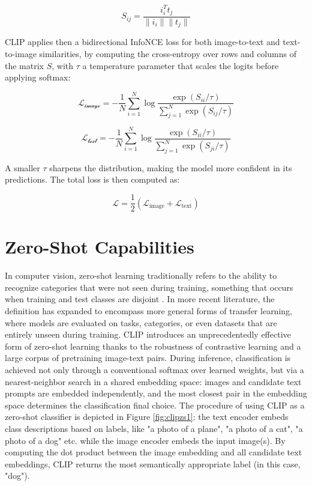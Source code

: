 \documentclass[a4paper, oneside, english]{sapthesis} %
\begin{document}
\begin{equation}\label{sim_matrix}
    S_{ij} = \frac{i_i^Tt_j}{\|i_i\| \| t_j\|}
\end{equation}

CLIP applies then a bidirectional InfoNCE loss for both image-to-text and text-to-image similarities, by computing the cross-entropy over rows and columns of the matrix $S$, with $\tau$ a temperature parameter that scales the logits before applying softmax:

\begin{equation} \label{L_image}
    \mathcal{L_{\text{image}}} = - \frac{1}{N} \sum_{i=1}^N \log \frac{\exp(S_{ii}/\tau)}{\sum_{j=1}^N \exp (S_{ij}/\tau)}
\end{equation}

\begin{equation} \label{L_text}
    \mathcal{L_{\text{text}}} = - \frac{1}{N} \sum_{i=1}^N \log \frac{\exp(S_{ii}/\tau)}{\sum_{j=1}^N \exp (S_{ji}/\tau)}
\end{equation}

A smaller $\tau$ sharpens the distribution, making the model more confident in its predictions. The total loss is then computed as:

\begin{equation}
    \mathcal{L} = \frac{1}{2} (\mathcal{L}_{\text{image}} + \mathcal{L}_{\text{text}})
\end{equation}



\section{Zero-Shot Capabilities}

In computer vision, zero-shot learning traditionally refers to the ability to recognize categories that were not seen during training, something that occurs when training and test classes are disjoint \cite{lampert2009learning}. In more recent literature, the definition has expanded to encompass more general forms of transfer learning, where models are evaluated on tasks, categories, or even datasets that are entirely unseen during training.
CLIP introduces an unprecedentedly effective form of zero-shot learning thanks to the robustness of contrastive learning and a large corpus of pretraining image-text pairs. During inference, classification is achieved not only through a conventional softmax over learned weights, but via a nearest-neighbor search in a shared embedding space: images and candidate text prompts are embedded independently, and the most closest pair in the embedding space determines the classification final choice. The procedure of using CLIP as a zero-shot classifier is depicted in Figure \ref{fig:clipzs1}: the text encoder embeds class descriptions based on labels, like
"a photo of a plane", "a photo of a cat", "a photo of a dog" etc. while the image encoder embeds the input image(s). By computing the dot product between the image embedding and all candidate text embeddings, CLIP returns the most semantically appropriate label (in this case, "dog"). 
\end{document}
